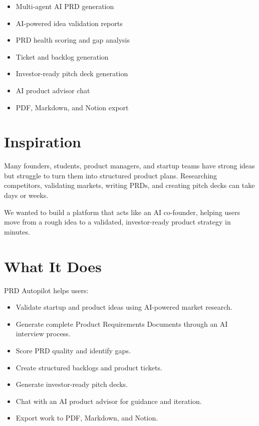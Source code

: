 \documentclass[11pt]{article}
\begin{document}
\begin{itemize}
    \item Multi-agent AI PRD generation
    \item AI-powered idea validation reports
    \item PRD health scoring and gap analysis
    \item Ticket and backlog generation
    \item Investor-ready pitch deck generation
    \item AI product advisor chat
    \item PDF, Markdown, and Notion export
\end{itemize}

\section{Inspiration}

Many founders, students, product managers, and startup teams have strong ideas but struggle to turn them into structured product plans. Researching competitors, validating markets, writing PRDs, and creating pitch decks can take days or weeks.

We wanted to build a platform that acts like an AI co-founder, helping users move from a rough idea to a validated, investor-ready product strategy in minutes.

\section{What It Does}

PRD Autopilot helps users:

\begin{itemize}
    \item Validate startup and product ideas using AI-powered market research.
    \item Generate complete Product Requirements Documents through an AI interview process.
    \item Score PRD quality and identify gaps.
    \item Create structured backlogs and product tickets.
    \item Generate investor-ready pitch decks.
    \item Chat with an AI product advisor for guidance and iteration.
    \item Export work to PDF, Markdown, and Notion.
\end{itemize}
\end{document}
